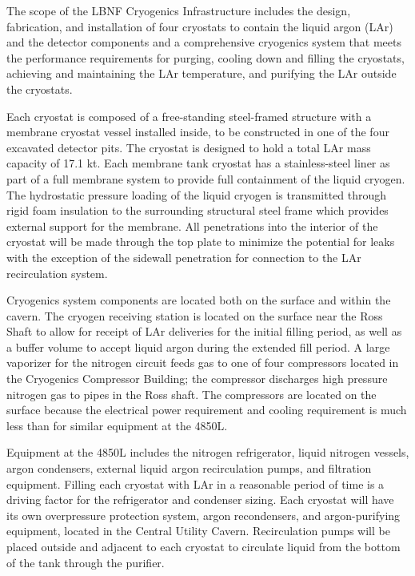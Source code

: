 The scope of the LBNF Cryogenics Infrastructure includes the design, fabrication, and installation of four cryostats to contain the liquid argon (LAr) and the detector components and a comprehensive cryogenics system that meets the performance requirements for purging, cooling down and filling the cryostats, achieving and maintaining the LAr temperature, and purifying the LAr outside the cryostats. 

Each cryostat is composed of a free-standing steel-framed structure with a membrane cryostat vessel installed inside, to be constructed in one of the four excavated detector pits. The cryostat is designed to hold a total LAr mass capacity of 17.1 kt. Each membrane tank cryostat has a stainless-steel liner as part of a full membrane system to provide full containment of the liquid cryogen. The hydrostatic pressure loading of the liquid cryogen is transmitted through rigid foam insulation to the surrounding structural steel frame which provides external support for the membrane. All penetrations into the interior of the cryostat will be made through the top plate to minimize the potential for leaks with the exception of the sidewall penetration for connection to the LAr recirculation system.

Cryogenics system components are located both on the surface and within the cavern. The cryogen receiving station is located on the surface near the Ross Shaft to allow for receipt of LAr deliveries for the initial filling period, as well as a buffer volume to accept liquid argon during the extended fill period. A large vaporizer for the nitrogen circuit feeds gas to one of four compressors located in the Cryogenics Compressor Building; the compressor discharges high pressure nitrogen gas to pipes in the Ross shaft. The compressors are located on the surface because the electrical power requirement and cooling requirement is much less than for similar equipment at the 4850L. 

Equipment at the 4850L includes the nitrogen refrigerator, liquid nitrogen vessels, argon condensers, external liquid argon recirculation pumps, and filtration equipment. Filling each cryostat with LAr in a reasonable period of time is a driving factor for the refrigerator and condenser sizing. Each cryostat will have its own overpressure protection system, argon recondensers, and argon-purifying equipment, located in the Central Utility Cavern. Recirculation pumps will be placed outside and adjacent to each cryostat to circulate liquid from the bottom of the tank through the purifier.



